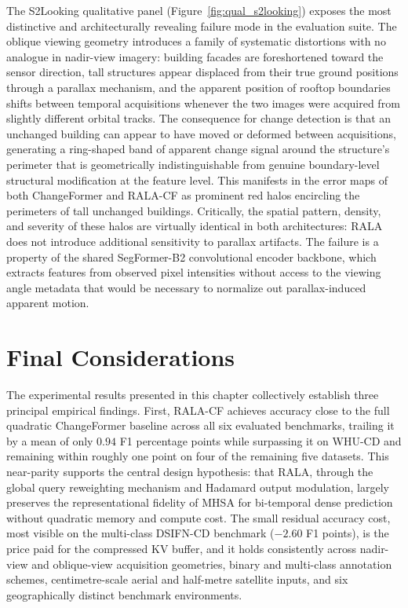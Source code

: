 The S2Looking qualitative panel (Figure~\ref{fig:qual_s2looking}) exposes the most distinctive and architecturally revealing failure mode in the evaluation suite. The oblique viewing geometry introduces a family of systematic distortions with no analogue in nadir-view imagery: building facades are foreshortened toward the sensor direction, tall structures appear displaced from their true ground positions through a parallax mechanism, and the apparent position of rooftop boundaries shifts between temporal acquisitions whenever the two images were acquired from slightly different orbital tracks. The consequence for change detection is that an unchanged building can appear to have moved or deformed between acquisitions, generating a ring-shaped band of apparent change signal around the structure's perimeter that is geometrically indistinguishable from genuine boundary-level structural modification at the feature level. This manifests in the error maps of both ChangeFormer and \ac{RALA-CF} as prominent red halos encircling the perimeters of tall unchanged buildings. Critically, the spatial pattern, density, and severity of these halos are virtually identical in both architectures: \ac{RALA} does not introduce additional sensitivity to parallax artifacts. The failure is a property of the shared SegFormer-B2 convolutional encoder backbone, which extracts features from observed pixel intensities without access to the viewing angle metadata that would be necessary to normalize out parallax-induced apparent motion.


\section{Final Considerations}
\label{sec:exp-final}

The experimental results presented in this chapter collectively establish three principal empirical findings. First, \ac{RALA-CF} achieves accuracy close to the full quadratic ChangeFormer baseline across all six evaluated benchmarks, trailing it by a mean of only $0.94$ F1 percentage points while surpassing it on WHU-CD and remaining within roughly one point on four of the remaining five datasets. This near-parity supports the central design hypothesis: that \ac{RALA}, through the global query reweighting mechanism and Hadamard output modulation, largely preserves the representational fidelity of \ac{MHSA} for bi-temporal dense prediction without quadratic memory and compute cost. The small residual accuracy cost, most visible on the multi-class DSIFN-CD benchmark ($-2.60$ F1 points), is the price paid for the compressed \ac{KV} buffer, and it holds consistently across nadir-view and oblique-view acquisition geometries, binary and multi-class annotation schemes, centimetre-scale aerial and half-metre satellite inputs, and six geographically distinct benchmark environments.


